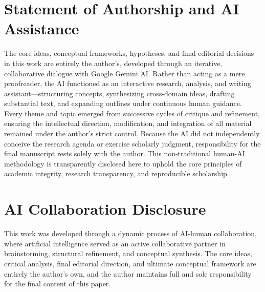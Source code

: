 \section*{Statement of Authorship and AI Assistance}
The core ideas, conceptual frameworks, hypotheses, and final editorial decisions in this work are entirely the author's, developed through an iterative, collaborative dialogue with Google Gemini AI. Rather than acting as a mere proofreader, the AI functioned as an interactive research, analysis, and writing assistant—structuring concepts, synthesizing cross-domain ideas, drafting substantial text, and expanding outlines under continuous human guidance. Every theme and topic emerged from successive cycles of critique and refinement, ensuring the intellectual direction, modification, and integration of all material remained under the author's strict control. Because the AI did not independently conceive the research agenda or exercise scholarly judgment, responsibility for the final manuscript rests solely with the author. This non-traditional human-AI methodology is transparently disclosed here to uphold the core principles of academic integrity, research transparency, and reproducible scholarship.

\section*{AI Collaboration Disclosure}
This work was developed through a dynamic process of AI-human collaboration, where artificial intelligence served as an active collaborative partner in brainstorming, structural refinement, and conceptual synthesis. The core ideas, critical analysis, final editorial direction, and ultimate conceptual framework are entirely the author's own, and the author maintains full and sole responsibility for the final content of this paper.

